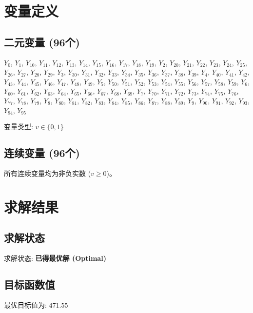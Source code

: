 \documentclass[a4paper,10pt]{article}
\begin{document}
\section{变量定义}

\subsection{二元变量 (96个)}

{\small $Y_{0}$, $Y_{1}$, $Y_{10}$, $Y_{11}$, $Y_{12}$, $Y_{13}$, $Y_{14}$, $Y_{15}$, $Y_{16}$, $Y_{17}$, $Y_{18}$, $Y_{19}$, $Y_{2}$, $Y_{20}$, $Y_{21}$, $Y_{22}$, $Y_{23}$, $Y_{24}$, $Y_{25}$, $Y_{26}$, $Y_{27}$, $Y_{28}$, $Y_{29}$, $Y_{3}$, $Y_{30}$, $Y_{31}$, $Y_{32}$, $Y_{33}$, $Y_{34}$, $Y_{35}$, $Y_{36}$, $Y_{37}$, $Y_{38}$, $Y_{39}$, $Y_{4}$, $Y_{40}$, $Y_{41}$, $Y_{42}$, $Y_{43}$, $Y_{44}$, $Y_{45}$, $Y_{46}$, $Y_{47}$, $Y_{48}$, $Y_{49}$, $Y_{5}$, $Y_{50}$, $Y_{51}$, $Y_{52}$, $Y_{53}$, $Y_{54}$, $Y_{55}$, $Y_{56}$, $Y_{57}$, $Y_{58}$, $Y_{59}$, $Y_{6}$, $Y_{60}$, $Y_{61}$, $Y_{62}$, $Y_{63}$, $Y_{64}$, $Y_{65}$, $Y_{66}$, $Y_{67}$, $Y_{68}$, $Y_{69}$, $Y_{7}$, $Y_{70}$, $Y_{71}$, $Y_{72}$, $Y_{73}$, $Y_{74}$, $Y_{75}$, $Y_{76}$, $Y_{77}$, $Y_{78}$, $Y_{79}$, $Y_{8}$, $Y_{80}$, $Y_{81}$, $Y_{82}$, $Y_{83}$, $Y_{84}$, $Y_{85}$, $Y_{86}$, $Y_{87}$, $Y_{88}$, $Y_{89}$, $Y_{9}$, $Y_{90}$, $Y_{91}$, $Y_{92}$, $Y_{93}$, $Y_{94}$, $Y_{95}$}

变量类型: $v \in \{0,1\}$

\subsection{连续变量 (96个)}

所有连续变量均为非负实数 ($v \geq 0$)。

\section{求解结果}

\subsection{求解状态}

求解状态: \textbf{已得最优解 (Optimal)}

\subsection{目标函数值}

最优目标值为: $\mathbf{471.55}$
\end{document}
